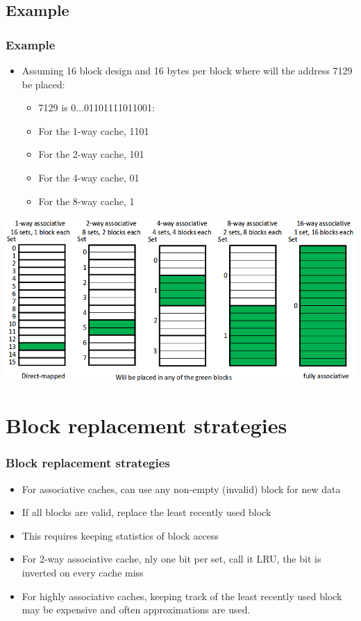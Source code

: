 \documentclass{beamer}
\begin{document}
\subsection{Example}
\begin{frame}
\frametitle{Example}
\begin{itemize}
\item Assuming 16 block design and 16 bytes per block where will the address 7129 be placed:
\begin{itemize}
\item 7129 is 0...011011{\color{red}1101}{\color{blue}1001}:
\item For the 1-way cache, {\color{red}1101}
\item For the 2-way cache, {\color{red}101}
\item For the 4-way cache, {\color{red}01}
\item For the 8-way cache, {\color{red}1}
\end{itemize}
\end{itemize}
\includegraphics[scale=0.35]{assex.png}
\end{frame}
\section{Block replacement strategies}
\begin{frame}
\frametitle{Block replacement strategies}
\begin{itemize}
\item For associative caches, can use any non-empty (invalid) block for new data
\item If all blocks are valid, replace the least recently used block
\item This requires keeping statistics of block access
\item For 2-way associative cache, nly one bit per set, call it LRU, the bit is inverted on every cache miss
\item For highly associative caches, keeping track of the least recently used block may be expensive and often approximations are used.
\end{itemize}
\end{frame}
\end{document}
